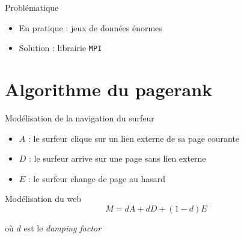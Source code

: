 \documentclass{beamer}
\begin{document}
    \begin{frame}
      \begin{block}{Problématique}
        \bigskip
        \begin{itemize}
          \item En pratique : jeux de données énormes
          \medskip
          \pause \item Solution : librairie \texttt{MPI}
        \end{itemize}
        \bigskip
      \end{block}
    \end{frame}
  
  \section{Algorithme du pagerank}
  
    \begin{frame}
      \begin{block}{Modélisation de la navigation du surfeur}
        \bigskip
        \begin{itemize}
          \item $A$ : le surfeur clique sur un lien externe de sa page courante
          \medskip
          \pause \item $D$ : le surfeur arrive sur une page sans lien externe
          \medskip
          \pause \item $E$ : le surfeur change de page au hasard
        \end{itemize}
        \bigskip
      \end{block}
    \end{frame}
    
    \begin{frame}
      \begin{block}{Modélisation du web}
        \bigskip
        $$ M = dA + dD + (1-d)E $$
        
        où $d$ est le \textit{damping factor}
        \bigskip
      \end{block}
    \end{frame}
    
\end{document}
